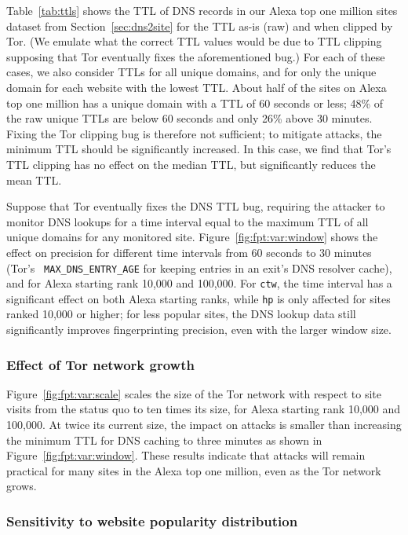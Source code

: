 Table~\ref{tab:ttls} shows the TTL of DNS records in our Alexa top one million
sites dataset from Section~\ref{sec:dns2site} for the
TTL as-is (raw) and when clipped by Tor.
(We emulate what the correct TTL values
would be due to TTL clipping supposing that Tor eventually fixes the
aforementioned bug.)  For each of these cases, we
also consider TTLs for all unique domains, and for only the unique
domain for each website with the lowest TTL.  About half of the sites on
Alexa top one million has a unique domain with a TTL of 60 seconds or
less; 48\% of the raw unique TTLs are below 60 seconds and only 26\%
above 30 minutes. Fixing the Tor clipping bug is therefore not
sufficient; to mitigate \name attacks, the minimum TTL should be
significantly increased.  In this case, we find that Tor's TTL clipping has
no effect on the median TTL, but significantly reduces the mean TTL.

Suppose that Tor eventually fixes the DNS TTL bug, requiring the
attacker to monitor DNS lookups for a time interval equal to the maximum
TTL of all unique domains for any monitored site.
Figure~\ref{fig:fpt:var:window} shows the effect on precision for
different time intervals from 60 seconds to 30 minutes (Tor's {\tt
  MAX\_DNS\_ENTRY\_AGE} for keeping entries in an exit's DNS resolver
cache), and for Alexa starting rank 10,000 and 100,000. For \texttt{ctw},
the time interval has a significant effect on both Alexa starting ranks,
while \texttt{hp} is only affected for sites ranked 10,000 or higher;
for less popular sites, the DNS lookup data still significantly improves
fingerprinting precision, even with the larger window size.

\subsubsection{Effect of Tor network growth}
Figure~\ref{fig:fpt:var:scale} scales the size of the Tor network with
respect to site
visits from the status quo to ten times its size, for Alexa starting rank 10,000 and
100,000. At twice its current size, the impact on \name attacks is smaller than
increasing the minimum TTL for DNS caching to three minutes as shown in
Figure~\ref{fig:fpt:var:window}. These results indicate that \name
attacks will remain
practical for many sites in the Alexa top one million, even as the Tor network grows.


\subsubsection{Sensitivity to website popularity distribution}

